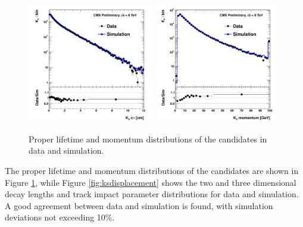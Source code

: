 \begin{figure}[htbp]
\centering
\includegraphics[width=0.49\textwidth]{plots/kshort/ksctau.pdf}
\includegraphics[width=0.49\textwidth]{plots/kshort/ksp.pdf}
\caption{Proper lifetime and momentum distributions of the \Kshort candidates in data and simulation. \label{fig:ksctau}}
\end{figure}

The proper lifetime and momentum distributions of the \Kshort candidates are
shown in Figure \ref{fig:ksctau}, while
Figure \ref{fig:ksdisplacement} shows the two and three dimensional decay lengths and track impact
 parameter distributions for data and simulation.  
 A good agreement between data and simulation is found, with simulation
 deviations not exceeding 10\%.   

